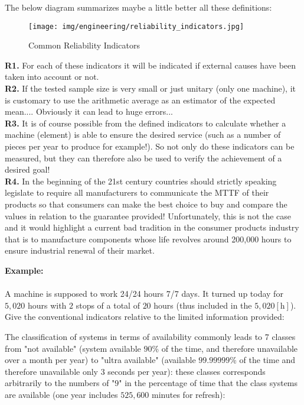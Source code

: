 	The below diagram summarizes maybe a little better all these definitions:
	\begin{figure}[H]
		\centering
		\texttt{[image: img/engineering/reliability\_indicators.jpg]}
		\caption{Common Reliability Indicators}
	\end{figure}
	\begin{tcolorbox}[title=Remarks,colframe=black,arc=10pt]
	\textbf{R1.} For each of these indicators it will be indicated if external causes have been taken into account or not.\\
	
	\textbf{R2.} If the tested sample size is very small or just unitary (only one machine), it is customary to use the arithmetic average as an estimator of the expected mean.... Obviously it can lead to huge errors...\\
	
	\textbf{R3.} It is of course possible from the defined indicators to calculate whether a machine (element) is able to ensure the desired service (such as a number of pieces per year to produce for example!). So not only do these indicators can be measured, but they can therefore also be used to verify the achievement of a desired goal!\\
	
	\textbf{R4.} In the beginning of the 21st century countries should strictly speaking legislate to require all manufacturers to communicate the MTTF of their products so that consumers can make the best choice to buy and compare the values in relation to the guarantee provided! Unfortunately, this is not the case and it would highlight a current bad tradition in the consumer products industry that is to manufacture components whose life revolves around 200,000 hours to ensure industrial renewal of their market.
	\end{tcolorbox}
	
	\begin{tcolorbox}[colframe=black,colback=white,sharp corners]
	\textbf{{\Large {}}Example:}\\\\
	A machine is supposed to work 24/24 hours 7/7 days. It turned up today for $5,020$ hours with $2$ stops of a total of $20$ hours (thus included in the $5,020 [\text{h}]$). Give the conventional indicators relative to the limited information provided:
	

	\end{tcolorbox}
	The classification of systems in terms of availability commonly leads to 7 classes from "not available" (system available $90$\% of the time, and therefore unavailable over a month per year) to "ultra available" (available $99.99999$\% of the time and therefore unavailable only $3$ seconds per year): these classes corresponds arbitrarily to the numbers of "$9$" in the percentage of time that the class systems are available (one year includes $525,600$ minutes for refresh):
	
